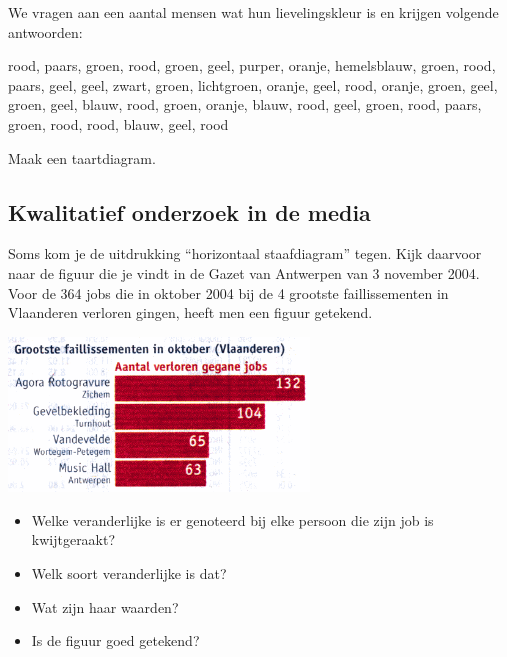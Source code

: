 \documentclass[12pt,twoside]{article}
\begin{document}
\begin{oefening}
We vragen aan een aantal mensen wat hun lievelingskleur is en krijgen volgende antwoorden:
\begin{center}
  rood, paars, groen, rood, groen, geel, purper, oranje, hemelsblauw, groen, rood, paars, geel, geel, zwart, groen, lichtgroen, oranje, geel, rood, oranje, groen, geel, groen, geel, blauw, rood, groen, oranje, blauw, rood, geel, groen, rood, paars, groen, rood, rood, blauw, geel, rood
\end{center}
Maak een taartdiagram.
\end{oefening}

\pagebreak
\subsection{Kwalitatief onderzoek in de media}

\begin{oefening}

Soms kom je de uitdrukking “horizontaal staafdiagram” tegen. Kijk daarvoor naar de figuur
die je vindt in de Gazet van Antwerpen van 3 november 2004. Voor de 364 jobs die in
oktober 2004 bij de 4 grootste faillissementen in Vlaanderen verloren gingen, heeft men een
figuur getekend.

\begin{center}
  \includegraphics[width=0.6\textwidth]{horizontaal_staafdiagram-faillissementen}
\end{center}


\begin{itemize}
\item Welke veranderlijke is er genoteerd bij elke persoon die zijn job is kwijtgeraakt?
\item Welk soort veranderlijke is dat?
\item Wat zijn haar waarden?
\item Is de figuur goed getekend?
\end{itemize}
\end{oefening}
\end{document}
